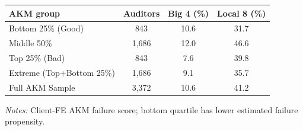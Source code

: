 \documentclass[10pt]{article}
\begin{document}
\begin{minipage}{19cm}\fontsize{10}{12}\selectfont\setlength{\tabcolsep}{4pt}\renewcommand{\arraystretch}{1.12}


\centering
{}
\begin{threeparttable}
\begin{tabular}{p{}ccc}
\toprule
AKM group & Auditors & Big 4 (\%) & Local 8 (\%) \\
\midrule
Bottom 25\% (Good) & 843 & 10.6 & 31.7 \\
Middle 50\% & 1,686 & 12.0 & 46.6 \\
Top 25\% (Bad) & 843 & 7.6 & 39.8 \\
Extreme (Top+Bottom 25\%) & 1,686 & 9.1 & 35.7 \\
Full AKM Sample & 3,372 & 10.6 & 41.2 \\
\bottomrule
\end{tabular}
\begin{tablenotes}\fontsize{9}{11}\selectfont
\item \raggedright \fontsize{9}{11}\selectfont \textit{Notes:} Client-FE AKM failure score; bottom quartile has lower estimated failure propensity.
\end{tablenotes}
\end{threeparttable}

\end{minipage}
\end{document}
